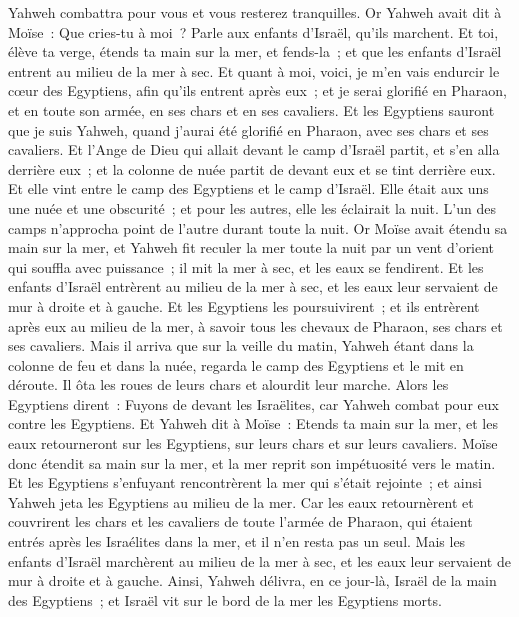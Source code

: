 \begin{multicols}{2}
Yahweh combattra pour vous et vous resterez tranquilles.
Or Yahweh avait dit à Moïse~: Que cries-tu à moi~? Parle aux enfants d'Israël, qu'ils marchent.
Et toi, élève ta verge, étends ta main sur la mer, et fends-la~; et que les enfants d'Israël entrent au milieu de la mer à sec.
 Et quant à moi, voici, je m'en vais endurcir le cœur des Egyptiens, afin qu'ils entrent après eux~; et je serai glorifié en Pharaon, et en toute son armée, en ses chars et en ses cavaliers.
Et les Egyptiens sauront que je suis Yahweh, quand j'aurai été glorifié en Pharaon, avec ses chars et ses cavaliers.
Et l'Ange de Dieu qui allait devant le camp d'Israël partit, et s'en alla derrière eux~; et la colonne de nuée partit de devant eux et se tint derrière eux.
Et elle vint entre le camp des Egyptiens et le camp d'Israël. Elle était aux uns une nuée et une obscurité~; et pour les autres, elle les éclairait la nuit. L'un des camps n'approcha point de l'autre durant toute la nuit.
Or Moïse avait étendu sa main sur la mer, et Yahweh fit reculer la mer toute la nuit par un vent d'orient qui souffla avec puissance~; il mit la mer à sec, et les eaux se fendirent.
Et les enfants d'Israël entrèrent au milieu de la mer à sec, et les eaux leur servaient de mur à droite et à gauche.
Et les Egyptiens les poursuivirent~; et ils entrèrent après eux au milieu de la mer, à savoir tous les chevaux de Pharaon, ses chars et ses cavaliers.
Mais il arriva que sur la veille du matin, Yahweh étant dans la colonne de feu et dans la nuée, regarda le camp des Egyptiens et le mit en déroute.
Il ôta les roues de leurs chars et alourdit leur marche. Alors les Egyptiens dirent~: Fuyons de devant les Israëlites, car Yahweh combat pour eux contre les Egyptiens.
Et Yahweh dit à Moïse~: Etends ta main sur la mer, et les eaux retourneront sur les Egyptiens, sur leurs chars et sur leurs cavaliers.
Moïse donc étendit sa main sur la mer, et la mer reprit son impétuosité vers le matin. Et les Egyptiens s'enfuyant rencontrèrent la mer qui s'était rejointe~; et ainsi Yahweh jeta les Egyptiens au milieu de la mer.
Car les eaux retournèrent et couvrirent les chars et les cavaliers de toute l'armée de Pharaon, qui étaient entrés après les Israélites dans la mer, et il n'en resta pas un seul.
Mais les enfants d'Israël marchèrent au milieu de la mer à sec, et les eaux leur servaient de mur à droite et à gauche.
Ainsi, Yahweh délivra, en ce jour-là, Israël de la main des Egyptiens~; et Israël vit sur le bord de la mer les Egyptiens morts.

\end{multicols}
